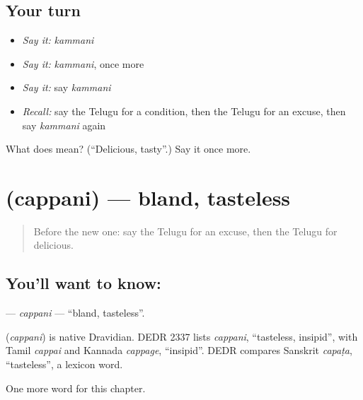 \subsection*{Your turn}
\begin{itemize}
\raggedright
  \item \emph{Say it:} \emph{kammani}
  \item \emph{Say it:} \emph{kammani}, once more
  \item \emph{Say it:} say \emph{kammani}
  \item \emph{Recall:} say the Telugu for a condition, then the Telugu for an excuse, then say \emph{kammani} again
\end{itemize}

\begin{tcolorbox}[breakable,colback=teal!4,colframe=teal!35!black,title={Before you move on}]
What does  mean? (\textquotedblleft{}Delicious, tasty\textquotedblright{}.) Say it once more.
\end{tcolorbox}
\section[\texorpdfstring{\te{చప్పని} (cappani)}{చప్పని (cappani)}]{ (cappani) — bland, tasteless}

\label{lesson:TE-C179-cappani}



\begin{quote}
Before the new one: say the Telugu for an excuse, then the Telugu for delicious.
\end{quote}

\subsection*{You'll want to know: }
\textbf{} — \emph{cappani} — \textquotedblleft{}bland, tasteless\textquotedblright{}.

\begin{cousinweb}
\textbf{} (\emph{cappani}) is native Dravidian. DEDR 2337 lists \emph{cappani}, \textquotedblleft{}tasteless, insipid\textquotedblright{}, with Tamil \emph{cappai} and Kannada \emph{cappage}, \textquotedblleft{}insipid\textquotedblright{}. DEDR compares Sanskrit \emph{capaṭa}, \textquotedblleft{}tasteless\textquotedblright{}, a lexicon word.
\end{cousinweb}

\begin{grammarlens}[title={What you've built}]
One more word for this chapter.
\end{grammarlens}

